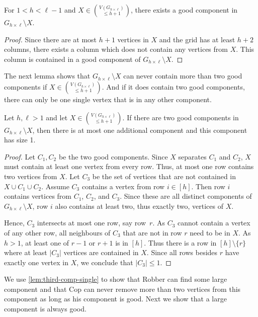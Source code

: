 \documentclass{lmcs}
\theoremstyle{plain}\newtheorem{claim}[thm]{Claim}   %
\newcommand{\grid}[2]{\ensuremath{G_{#1 \times #2}}}
\begin{document}
\begin{lem} \label{obs:good-component}
	For $1 < h < \ell - 1$ and $X\in \binom{V(\grid{h}{\ell})}{\leq h+1}$, there exists a good component in $\grid{h}{\ell} \setminus X$.
\end{lem}

\begin{proof}
	Since there are at most $h+1$ vertices in $X$ and the grid has at least $h+2$ columns, there exists a column which does not contain any vertices from $X$. This column is contained in a good component of $\grid{h}{\ell} \setminus X$.
\end{proof}

The next lemma shows that $\grid{h}{\ell}\setminus X$ can never contain more than two good components if $X\in\binom{V(\grid{h}{\ell})}{\leq h+1}$.
And if it does contain two good components, there can only be one single vertex that is in any other component.

\begin{lem}
	\label{lem:third-comp-single}
	Let $h,\ell>1$ and let $X\in \binom{V(\grid{h}{\ell})}{\leq h+1}$. If there are two good components in $\grid{h}{\ell}\setminus X$, then there is at most one additional component and this component has size 1.
\end{lem}

\begin{proof}
	Let $C_1,C_2$ be the two good components.
	Since $X$ separates $C_1$ and $C_2$, $X$ must contain at least one vertex from every row. Thus, at most one row contains two vertices from $X$.
	Let $C_3$ be the set of vertices that are not contained in $X\cup C_1\cup C_2$.
	Assume $C_3$ contains a vertex from row $i\in[h]$.
	Then row $i$ contains vertices from $C_1$, $C_2$, and $C_3$. 
	Since these are all distinct components of $\grid{h}{\ell}\setminus X$, row $i$ also contains at least two, thus exactly two, vertices of $X$.
	
	Hence, $C_3$ intersects at most one row, say row~$r$.
	As $C_3$ cannot contain a vertex of any other row, all neighbours of $C_3$ that are not in row $r$ need to be in $X$.
	As $h>1$, at least one of $r-1$ or $r+1$ is in $[h]$.
	Thus there is a row in $[h]\setminus \{r\}$ where at least $|C_3|$ vertices are contained in $X$.
	Since all rows besides $r$ have exactly one vertex in $X$, we conclude that $|C_3|\leq 1$.
\end{proof}

We use \autoref{lem:third-comp-single} to show that Robber can find some large component and that Cop can never remove more than two vertices from this component as long as his component is good.
Next we show that a large component is always good.
\end{document}
